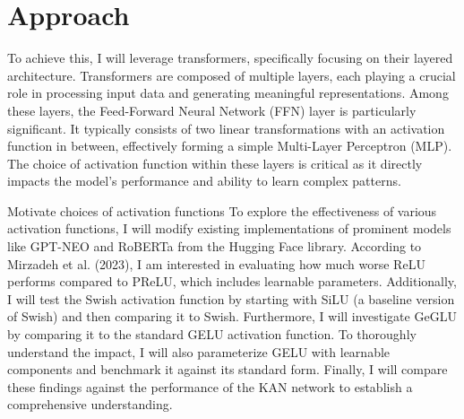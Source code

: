 \clearpage
\section{Approach}




To achieve this, I will leverage transformers, specifically focusing on their layered architecture. Transformers are composed of multiple layers, each playing a crucial role in processing input data and generating meaningful representations. Among these layers, the Feed-Forward Neural Network (FFN) layer is particularly significant. It typically consists of two linear transformations with an activation function in between, effectively forming a simple Multi-Layer Perceptron (MLP). The choice of activation function within these layers is critical as it directly impacts the model's performance and ability to learn complex patterns.

Motivate choices of activation functions
To explore the effectiveness of various activation functions, I will modify existing implementations of prominent models like GPT-NEO and RoBERTa from the Hugging Face library. According to Mirzadeh et al. (2023), I am interested in evaluating how much worse ReLU performs compared to PReLU, which includes learnable parameters. Additionally, I will test the Swish activation function by starting with SiLU (a baseline version of Swish) and then comparing it to Swish. Furthermore, I will investigate GeGLU by comparing it to the standard GELU activation function. To thoroughly understand the impact, I will also parameterize GELU with learnable components and benchmark it against its standard form. Finally, I will compare these findings against the performance of the KAN network to establish a comprehensive understanding.

